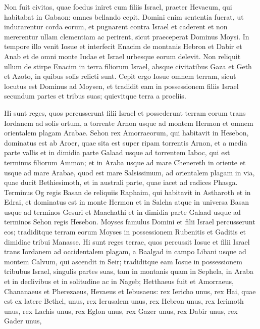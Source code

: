 \begin{biblechapter}
\begin{biblechapter}
\begin{biblechapter}
\begin{biblechapter}
\begin{biblechapter}
\begin{biblechapter}
\begin{biblechapter}
\begin{biblechapter}
\begin{biblechapter}
\begin{biblechapter}
\begin{biblechapter}
\verse Non fuit civitas, quae foedus iniret cum filiis Israel, praeter Hevaeum, qui habitabat in Gabaon: omnes bellando cepit. 
\verse Domini enim sententia fuerat, ut indurarentur corda eorum, et pugnarent contra Israel et caderent et non mererentur ullam clementiam ac perirent, sicut praeceperat Dominus Moysi.
 \verse In tempore illo venit Iosue et interfecit Enacim de montanis Hebron et Dabir et Anab et de omni monte Iudae et Israel urbesque eorum delevit. 
\verse Non reliquit ullum de stirpe Enacim in terra filiorum Israel, absque civitatibus Gaza et Geth et Azoto, in quibus solis relicti sunt. 
\verse Cepit ergo Iosue omnem terram, sicut locutus est Dominus ad Moysen, et tradidit eam in possessionem filiis Israel secundum partes et tribus suas; quievitque terra a proeliis.
 
\begin{biblechapter}
\verse Hi sunt reges, quos percusserunt filii Israel et possederunt terram eorum trans Iordanem ad solis ortum, a torrente Arnon usque ad montem Hermon et omnem orientalem plagam Arabae.
 \verse Sehon rex Amorraeorum, qui habitavit in Hesebon, dominatus est ab Aroer, quae sita est super ripam torrentis Arnon, et a media parte vallis et in dimidia parte Galaad usque ad torrentem Iaboc, qui est terminus filiorum Ammon; 
\verse et in Araba usque ad mare Chenereth in oriente et usque ad mare Arabae, quod est mare Salsissimum, ad orientalem plagam in via, quae ducit Bethiesimoth, et in australi parte, quae iacet ad radices Phasga.
 \verse Terminus Og regis Basan de reliquiis Raphaim, qui habitavit in Astharoth et in Edrai, 
\verse et dominatus est in monte Hermon et in Salcha atque in universa Basan usque ad terminos Gesuri et Maachathi et in dimidia parte Galaad usque ad terminos Sehon regis Hesebon. 
\verse Moyses famulus Domini et filii Israel percusserunt eos; tradiditque terram eorum Moyses in possessionem Rubenitis et Gaditis et dimidiae tribui Manasse.
 \verse Hi sunt reges terrae, quos percussit Iosue et filii Israel trans Iordanem ad occidentalem plagam, a Baalgad in campo Libani usque ad montem Calvum, qui ascendit in Seir; tradiditque eam Iosue in possessionem tribubus Israel, singulis partes suas, 
\verse tam in montanis quam in Sephela, in Araba et in declivibus et in solitudine ac in Nageb; Hetthaeus fuit et Amorraeus, Chananaeus et Pherezaeus, Hevaeus et Iebusaeus: 
\verse rex Iericho unus, rex Hai, quae est ex latere Bethel, unus, 
\verse rex Ierusalem unus, rex Hebron unus, 
\verse rex Ierimoth unus, rex Lachis unus, 
\verse rex Eglon unus, rex Gazer unus, 
\verse rex Dabir unus, rex Gader unus, 

\end{biblechapter}
\end{biblechapter}
\end{biblechapter}
\end{biblechapter}
\end{biblechapter}
\end{biblechapter}
\end{biblechapter}
\end{biblechapter}
\end{biblechapter}
\end{biblechapter}
\end{biblechapter}
\end{biblechapter}
